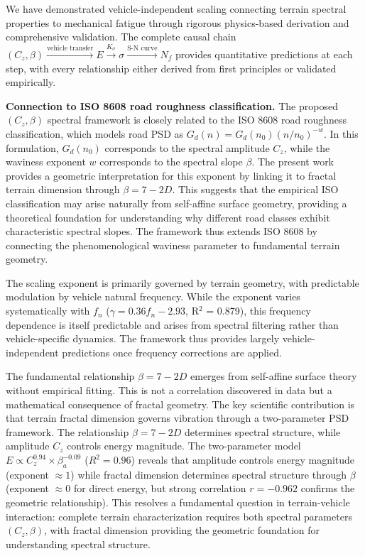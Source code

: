 \documentclass[11pt]{article}
\begin{document}
We have demonstrated vehicle-independent scaling connecting terrain spectral properties to mechanical fatigue through rigorous physics-based derivation and comprehensive validation. The complete causal chain $(C_z, \beta) \xrightarrow{\text{vehicle transfer}} E \xrightarrow{K_\sigma} \sigma \xrightarrow{\text{S-N curve}} N_f$ provides quantitative predictions at each step, with every relationship either derived from first principles or validated empirically.

\textbf{Connection to ISO 8608 road roughness classification.} The proposed $(C_z, \beta)$ spectral framework is closely related to the ISO 8608 road roughness classification, which models road PSD as $G_d(n) = G_d(n_0)(n/n_0)^{-w}$. In this formulation, $G_d(n_0)$ corresponds to the spectral amplitude $C_z$, while the waviness exponent $w$ corresponds to the spectral slope $\beta$. The present work provides a geometric interpretation for this exponent by linking it to fractal terrain dimension through $\beta = 7 - 2D$. This suggests that the empirical ISO classification may arise naturally from self-affine surface geometry, providing a theoretical foundation for understanding why different road classes exhibit characteristic spectral slopes. The framework thus extends ISO 8608 by connecting the phenomenological waviness parameter to fundamental terrain geometry.

The scaling exponent is primarily governed by terrain geometry, with predictable modulation by vehicle natural frequency. While the exponent varies systematically with $f_n$ ($\gamma = 0.36 f_n - 2.93$, R$^2$ = 0.879), this frequency dependence is itself predictable and arises from spectral filtering rather than vehicle-specific dynamics. The framework thus provides largely vehicle-independent predictions once frequency corrections are applied.

The fundamental relationship $\beta = 7-2D$ emerges from self-affine surface theory without empirical fitting\cite{Mandelbrot1982,Turcotte1997}. This is not a correlation discovered in data but a mathematical consequence of fractal geometry. The key scientific contribution is that terrain fractal dimension governs vibration through a two-parameter PSD framework. The relationship $\beta = 7-2D$ determines spectral structure, while amplitude $C_z$ controls energy magnitude. The two-parameter model $E \propto C_z^{0.94} \times \beta_a^{-0.09}$ ($R^2 = 0.96$) reveals that amplitude controls energy magnitude (exponent $\approx 1$) while fractal dimension determines spectral structure through $\beta$ (exponent $\approx 0$ for direct energy, but strong correlation $r=-0.962$ confirms the geometric relationship). This resolves a fundamental question in terrain-vehicle interaction: complete terrain characterization requires both spectral parameters $(C_z, \beta)$, with fractal dimension providing the geometric foundation for understanding spectral structure.
\end{document}
